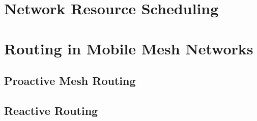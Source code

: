 

\section{Network Resource Scheduling}


    
\section{Routing in Mobile Mesh Networks}

\subsection{Proactive Mesh Routing}


            

\subsection{Reactive Routing}

